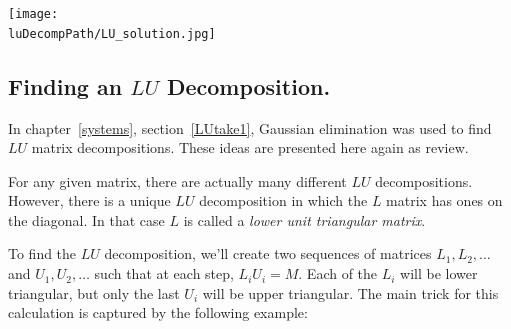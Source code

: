 
\begin{center}
\texttt{[image: \\luDecompPath/LU\_solution.jpg]}
\end{center}

\subsection{Finding an $LU$ Decomposition.}
\label{finding_LU_decomp}

In chapter~\ref{systems}, section~\ref{LUtake1}, Gaussian elimination was used to find~$LU$ matrix decompositions.  
These ideas are presented here again as review.
 
For any given matrix, there are actually many different $LU$ decompositions.  However, there is a unique $LU$ decomposition in which the $L$ matrix has ones on the diagonal. In that case $L$ is called a \emph{lower unit triangular matrix}.

To find the $LU$ decomposition, we'll create two sequences of matrices $L_1, L_2,\ldots$ and $U_1, U_2, \ldots$ such that at each step, $L_iU_i=M$.  Each of the $L_i$ will be lower triangular, but only the last $U_i$ will be upper triangular.
 The main trick for this calculation is captured by the following example:

